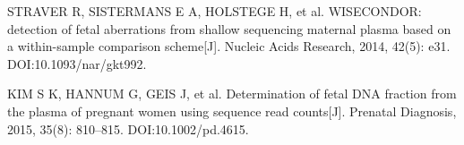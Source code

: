 \documentclass[12pt,a4paper]{ctexrep}
\numberwithin{equation}{section}
\begin{document}
\begin{spacing}{1.25}
\begin{enumerate}[label={[\arabic*]}, leftmargin=2em, labelwidth=1.5em, labelsep=0.5em, itemsep=0pt, parsep=0pt, partopsep=0pt, topsep=0pt]
		\item STRAVER R, SISTERMANS E A, HOLSTEGE H, et al. WISECONDOR: detection of fetal aberrations from shallow sequencing maternal plasma based on a within-sample comparison scheme[J]. Nucleic Acids Research, 2014, 42(5): e31. DOI:10.1093/nar/gkt992.
		\item KIM S K, HANNUM G, GEIS J, et al. Determination of fetal DNA fraction from the plasma of pregnant women using sequence read counts[J]. Prenatal Diagnosis, 2015, 35(8): 810--815. DOI:10.1002/pd.4615.
	\end{enumerate}
	\end{spacing}
	
	
	
	
\end{document}
